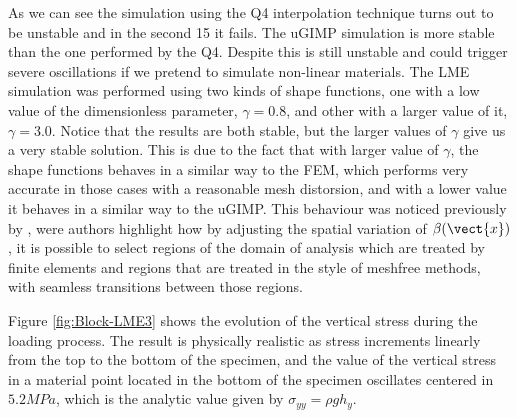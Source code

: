 As we can see the simulation using the Q4 interpolation technique
turns out to be unstable and in the second 15 it fails. The uGIMP
simulation is more stable than the one performed by the Q4. Despite
this is still unstable and could trigger severe oscillations if we
pretend to simulate non-linear materials. The LME simulation was
performed using two kinds of shape functions, one with a low value of
the dimensionless parameter, $\gamma = 0.8$, and other with a larger
value of it, $\gamma = 3.0$. Notice that the results are both
stable, but the larger values of $\gamma$ give us a very stable
solution. This is due to the fact that with larger value of $\gamma$,
the shape functions behaves in a similar way to the FEM, which performs
very accurate in those cases with a reasonable mesh distorsion, and
with a lower value it behaves in a similar way to the uGIMP. This
behaviour was noticed previously by \cite{Arroyo2006}, were authors
highlight how by adjusting the spatial variation of $\beta(\vect{x})$,
it is possible to select regions of the domain of analysis which are
treated by finite elements and regions that are treated in the style
of meshfree methods, with seamless transitions between those regions.

Figure \ref{fig:Block-LME3} shows the evolution of the vertical stress
during the loading process. The result is physically realistic as
stress increments linearly from the top to the bottom of the specimen,
and the value of the vertical stress in a material point located in
the bottom of the specimen oscillates centered in $5.2 MPa$, which is
the analytic value given by $\sigma_{yy} = \rho g h_y$. 

